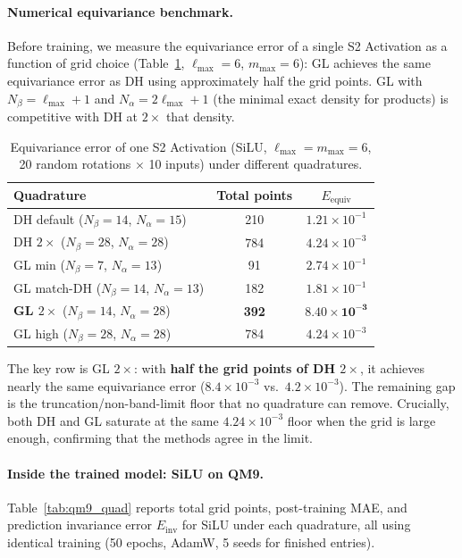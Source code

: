 \documentclass[10pt,twocolumn]{article}
\begin{document}
\paragraph{Numerical equivariance benchmark.}
Before training, we measure the equivariance error of a single S2 Activation as a
function of grid choice (Table~\ref{tab:quadbench}, $\ell_{\max}{=}6$, $m_{\max}{=}6$):
GL achieves the same equivariance error as DH using approximately half the grid points.
GL with $N_\beta{=}\ell_{\max}{+}1$ and $N_\alpha{=}2\ell_{\max}{+}1$ (the minimal exact
density for products) is competitive with DH at $2\times$ that density.

\begin{table}[t]
  \caption{Equivariance error of one S2 Activation (SiLU, $\ell_{\max}{=}\!m_{\max}{=}6$,
  20 random rotations $\times$ 10 inputs) under different quadratures.}
  \label{tab:quadbench}
  \centering
  \small
  \begin{tabular}{lcc}
    \toprule
    Quadrature & Total points & $E_{\mathrm{equiv}}$ \\
    \midrule
    DH default ($N_\beta{=}14$, $N_\alpha{=}15$) & 210 & $1.21{\times}10^{-1}$ \\
    DH $2\times$ ($N_\beta{=}28$, $N_\alpha{=}28$) & 784 & $4.24{\times}10^{-3}$ \\
    GL min ($N_\beta{=}7$, $N_\alpha{=}13$) & 91 & $2.74{\times}10^{-1}$ \\
    GL match-DH ($N_\beta{=}14$, $N_\alpha{=}13$) & 182 & $1.81{\times}10^{-1}$ \\
    \textbf{GL $2\times$} ($N_\beta{=}14$, $N_\alpha{=}28$) & \textbf{392} & $\mathbf{8.40{\times}10^{-3}}$ \\
    GL high ($N_\beta{=}28$, $N_\alpha{=}28$) & 784 & $4.24{\times}10^{-3}$ \\
    \bottomrule
  \end{tabular}
\end{table}

The key row is GL $2\times$: with \textbf{half the grid points of DH $2\times$}, it achieves
nearly the same equivariance error ($8.4{\times}10^{-3}$ vs.\ $4.2{\times}10^{-3}$). The
remaining gap is the truncation/non-band-limit floor that no quadrature can remove.
Crucially, both DH and GL saturate at the same $4.24{\times}10^{-3}$ floor when the grid
is large enough, confirming that the methods agree in the limit.

\paragraph{Inside the trained model: SiLU on QM9.}
Table~\ref{tab:qm9_quad} reports total grid points, post-training MAE, and prediction
invariance error $E_{\mathrm{inv}}$ for SiLU under each quadrature, all using identical
training (50 epochs, AdamW, 5 seeds for finished entries).
\end{document}
